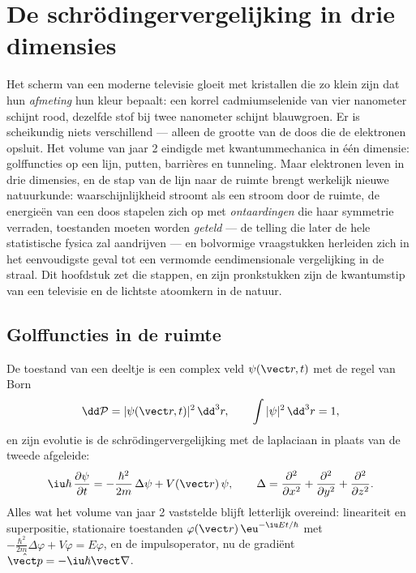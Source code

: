 \chapter{De schrödingervergelijking in drie dimensies}\label{ch:b3:schrodinger-three-dimensions}

Het scherm van een moderne televisie gloeit met kristallen die zo klein
zijn dat hun \emph{afmeting} hun kleur bepaalt: een korrel
cadmiumselenide van vier nanometer schijnt rood, dezelfde stof bij twee
nanometer schijnt blauwgroen. Er is scheikundig niets verschillend ---
alleen de grootte van de doos die de elektronen opsluit. Het volume van
jaar 2 eindigde met kwantummechanica in één dimensie: golffuncties op een
lijn, putten, barrières en tunneling. Maar elektronen leven in drie
dimensies, en de stap van de lijn naar de ruimte brengt werkelijk nieuwe
natuurkunde: waarschijnlijkheid stroomt als een stroom door de ruimte,
de energieën van een doos stapelen zich op met \emph{ontaardingen} die
haar symmetrie verraden, toestanden moeten worden \emph{geteld} --- de
telling die later de hele statistische fysica zal aandrijven --- en
bolvormige vraagstukken herleiden zich in het eenvoudigste geval tot een
vermomde eendimensionale vergelijking in de straal. Dit hoofdstuk zet die
stappen, en zijn pronkstukken zijn de kwantumstip van een televisie en de
lichtste atoomkern in de natuur.

\section{Golffuncties in de ruimte}

\begin{definition}\label{def:b3:schrodinger-three-dimensions:psi3d}
De toestand van een deeltje is een complex veld $\psi(\vect r, t)$ met de
regel van Born
\[
\dd\mathcal P = |\psi(\vect r, t)|^2\,\dd^3r , \qquad
\int|\psi|^2\,\dd^3r = 1 ,
\]
en zijn evolutie is de schrödingervergelijking met de laplaciaan in plaats
van de tweede afgeleide:
\[
\iu\hbar\,\frac{\partial\psi}{\partial t}
 = -\frac{\hbar^2}{2m}\,\Delta\psi + V(\vect r)\,\psi ,
\qquad
\Delta = \frac{\partial^2}{\partial x^2} +
\frac{\partial^2}{\partial y^2} + \frac{\partial^2}{\partial z^2} .
\]
Alles wat het volume van jaar 2 vaststelde blijft letterlijk overeind:
lineariteit en superpositie, stationaire toestanden
$\varphi(\vect r)\,\eu^{-\iu Et/\hbar}$ met
$-\tfrac{\hbar^2}{2m}\Delta\varphi + V\varphi = E\varphi$, en de
impulsoperator, nu de gradiënt $\hat{\vect p} =
-\iu\hbar\vect\nabla$.
\end{definition}

